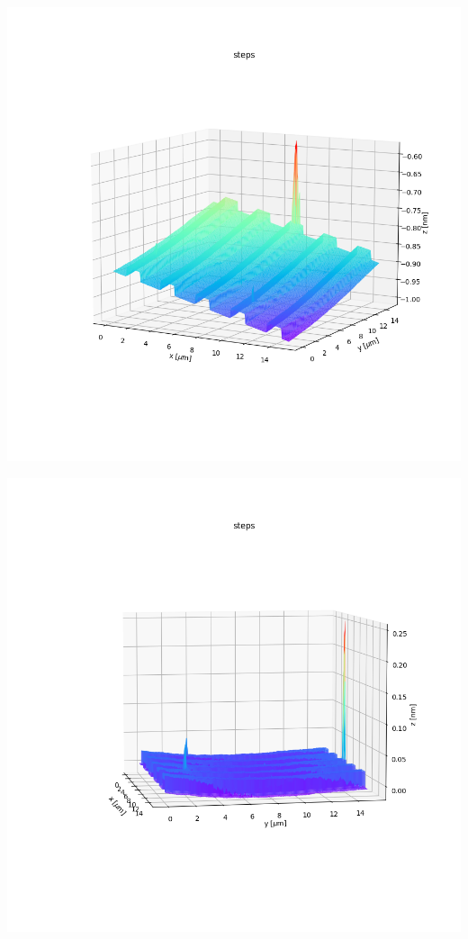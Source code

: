 \documentclass{article}
\begin{document}
\begin{center}
    \begin{minipage}{0.3\textwidth}
        \includegraphics*[width=\linewidth]{../images/steps_import1.png}
    \end{minipage}
    \hfill
    \begin{minipage}{0.3\textwidth}
        \includegraphics*[width=\linewidth]{../images/steps_import2.png}

\end{minipage}
\end{center}
\end{document}
